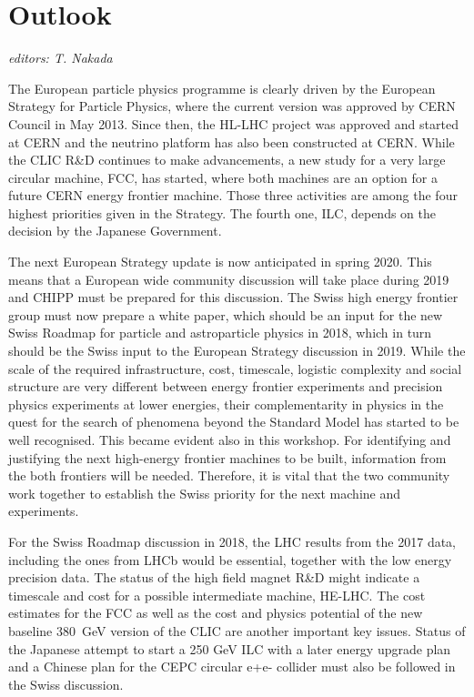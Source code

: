 \section{Outlook}\label{outlook}{\it editors: T. Nakada}

\noindent The European particle physics programme is clearly driven by the European Strategy for Particle Physics, where the current version was approved by CERN Council in May 2013. Since then, the HL-LHC project was approved and started at CERN and the neutrino platform has also been constructed at CERN. While the CLIC R\&D continues to make advancements, a new study for a very large circular machine, FCC, has started, where  both machines are an option for a future CERN energy frontier machine. Those three activities are among the four highest priorities given in the Strategy. The fourth one, ILC, depends on the decision by the Japanese Government. \medskip

\noindent The next European Strategy update is now anticipated in spring 2020. This means that a European wide community discussion will take place during 2019 and CHIPP must be prepared for this discussion. The Swiss high energy frontier group must now prepare a white paper, which should be an input for the new Swiss Roadmap for particle and astroparticle physics in 2018, which in turn should be the Swiss input to the European Strategy discussion in 2019. 
While the scale of the required infrastructure, cost, timescale, logistic complexity and social structure are very different between energy frontier experiments and precision physics experiments at lower energies, their complementarity in physics in the quest for the search of phenomena beyond the Standard Model has started to be well recognised. This became evident also in this workshop. For identifying and justifying the next high-energy frontier machines to be built, information from the both frontiers will be needed. Therefore, it is vital that the two community work together to establish the Swiss priority for the next machine and experiments.  \medskip 
  
\noindent For the Swiss Roadmap discussion in 2018, the LHC results from the 2017 data, including the ones from LHCb would be essential, together with the low energy precision data. The status of the high field magnet R\&D might indicate a timescale and cost for a possible intermediate machine, HE-LHC. The cost estimates for the FCC as well as the cost and physics potential of the new baseline 380~GeV version of the CLIC are another important key issues. Status of the Japanese attempt to start a 250 GeV ILC with a later energy upgrade plan and a Chinese plan for the CEPC circular e+e- collider must also be followed in the Swiss discussion. 



